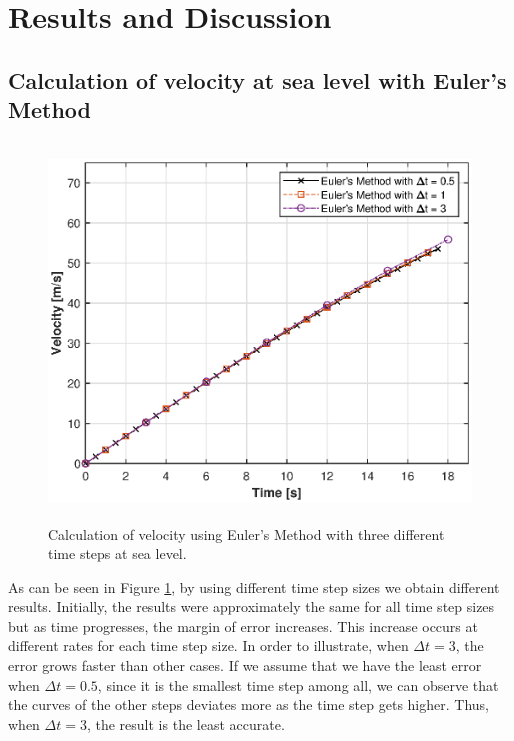 \documentclass[letterpaper,12pt]{article}
\begin{document}
\newpage

\section{Results and Discussion}

\subsection{Calculation of velocity at sea level with Euler's Method }
\begin{figure}[ht]
\centering \includegraphics[max height=10cm]{graphs/question1.eps}
\caption{Calculation of velocity using Euler's Method with three different time steps at sea level.}
     \label{fig:q1}
\end{figure}

As can be seen in Figure \ref{fig:q1}, by using different time step sizes we obtain different results.
Initially, the results were approximately the same for all time step sizes but as time progresses, the margin of error increases.
This increase occurs at different rates for each time step size. In order to illustrate, when $ \Delta t = 3 $, the
error grows faster than other cases. If we assume that we have the least error when $ \Delta t = 0.5 $, since it is
the smallest time step among all, we can observe that the curves of the other steps deviates more as the time step gets
higher. Thus, when $ \Delta t = 3 $, the result is the least accurate.
\end{document}
